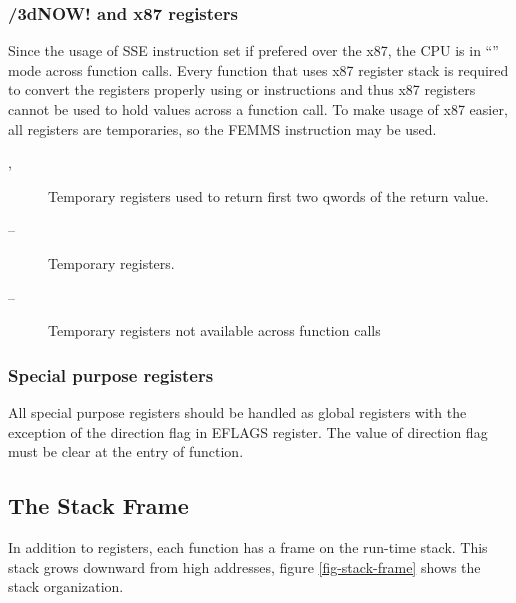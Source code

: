 \subsubsection {\MMX/3dNOW! and x87 registers}
Since the usage of SSE instruction set if prefered over the x87, the CPU is in
``\MMX'' mode across function calls. Every function that uses x87 register
stack is required to convert the registers properly using  or 
instructions and thus x87 registers cannot be used to hold values across a
function call.  To make usage of x87 easier, all \MMX registers are temporaries,
so the FEMMS instruction may be used.
\begin{description}
\item [, ] Temporary registers used to return first two qwords of the return value.
\item [ -- ] Temporary registers.
\item [ -- ] Temporary registers not available across function calls
\end{description}


\subsubsection {Special purpose registers}
All special purpose registers should be handled as global registers with
the exception of the direction flag in EFLAGS register.  The value of direction
flag must be clear at the entry of function.

\subsection{The Stack Frame}
In addition to registers, each function has a frame on the run-time stack.  This
stack grows downward from high addresses, figure \ref{fig-stack-frame} shows the
stack organization.


